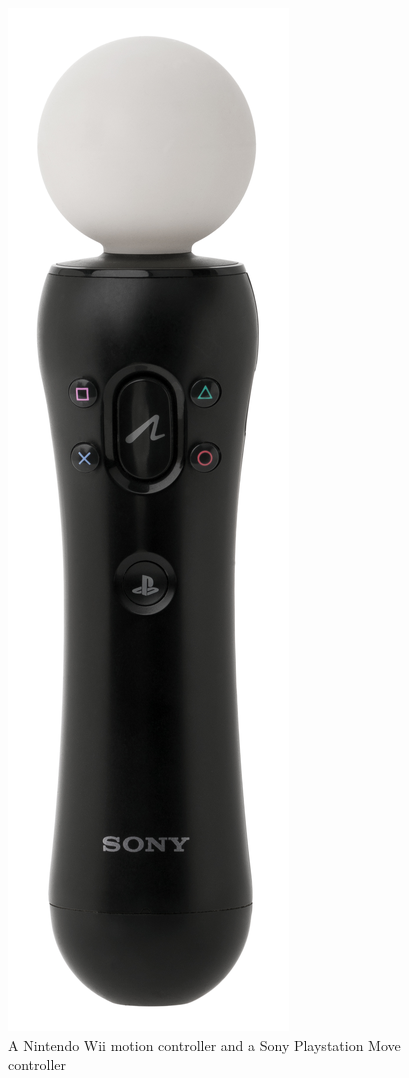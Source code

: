\documentclass[11pt]{article}
\begin{document}
	
	\begin{figure}
		\vspace{-20pt}
		\begin{center}
			\includegraphics[scale=0.02]{images/ps_move.jpg}
		\end{center}			
		\vspace{-20pt}
			\caption{A Nintendo Wii motion controller and a Sony Playstation Move controller}
		\vspace{-10pt}
	\end{figure}		
	
\end{document}
